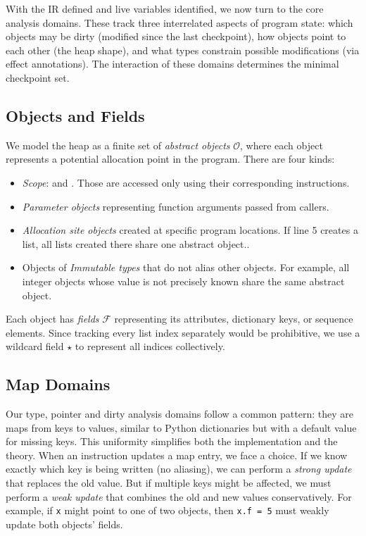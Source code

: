 With the IR defined and live variables identified, we now turn to the core analysis domains. These track three interrelated aspects of program state: which objects may be dirty (modified since the last checkpoint), how objects point to each other (the heap shape), and what types constrain possible modifications (via effect annotations). The interaction of these domains determines the minimal checkpoint set.

\subsection{Objects and Fields}
We model the heap as a finite set of \emph{abstract objects} $\mathcal{O}$, where each object represents a potential allocation point in the program. There are four kinds:
\begin{itemize}
    \item \emph{Scope}: \tLOCALS and \tGLOBALS. Those are accessed only using their corresponding instructions.
    \item \emph{Parameter objects} representing function arguments passed from callers.
    \item \emph{Allocation site objects} created at specific program locations. If line 5 creates a list, all lists created there share one abstract object..
    \item Objects of \emph{Immutable types} that do not alias other objects. For example, all integer objects whose value is not precisely known share the same abstract object.
\end{itemize}
Each object has \emph{fields} $\mathcal{F}$ representing its attributes, dictionary keys, or sequence elements. Since tracking every list index separately would be prohibitive, we use a wildcard field $\star$ to represent all indices collectively.

\subsection{Map Domains}
Our type, pointer and dirty analysis domains follow a common pattern: they are maps from keys to values, similar to Python dictionaries but with a default value for missing keys. This uniformity simplifies both the implementation and the theory.
When an instruction updates a map entry, we face a choice. If we know exactly which key is being written (no aliasing), we can perform a \emph{strong update} that replaces the old value. But if multiple keys might be affected, we must perform a \emph{weak update} that combines the old and new values conservatively. For example, if \texttt{x} might point to one of two objects, then \texttt{x.f = 5} must weakly update both objects' fields.

